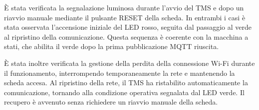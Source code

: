 È stata verificata la segnalazione luminosa durante
l'avvio del TMS e dopo un riavvio manuale mediante
il pulsante RESET della scheda.
In entrambi i casi è stata osservata l'accensione
iniziale del LED rosso, seguita dal passaggio al verde
al ripristino della comunicazione.
Questa sequenza è coerente con la macchina a stati,
che abilita il verde dopo la prima pubblicazione MQTT
riuscita.

È stata inoltre verificata la gestione della perdita
della connessione Wi-Fi durante il funzionamento,
interrompendo temporaneamente la rete e mantenendo
la scheda accesa.
Al ripristino della rete, il TMS ha ristabilito
automaticamente la comunicazione, tornando alla
condizione operativa segnalata dal LED verde.
Il recupero è avvenuto senza richiedere un riavvio
manuale della scheda.